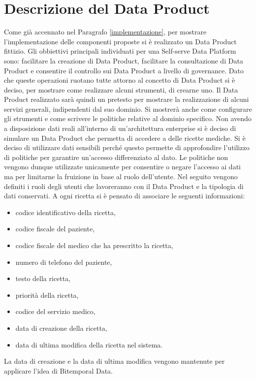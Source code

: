 \documentclass[a4paper,12pt]{report}
\begin{document}
\section{Descrizione del Data Product}\label{caratteristicheDP}
Come già accennato nel Paragrafo \ref{implementazione}, per mostrare l'implementazione delle componenti proposte si è realizzato un Data Product fittizio.
Gli obbiettivi principali individuati per una Self-serve Data Platform sono: facilitare la creazione di Data Product, facilitare la consultazione di Data Product e consentire il controllo sui Data Product a livello di governance. 
Dato che queste operazioni ruotano tutte attorno al concetto di Data Product si è deciso, per mostrare come realizzare alcuni strumenti, di crearne uno.
Il Data Product realizzato sarà quindi un pretesto per mostrare la realizzazione di alcuni servizi generali, indipendenti dal suo dominio.
Si mostrerà anche come configurare gli strumenti e come scrivere le politiche relative al dominio specifico. 
Non avendo a disposizione dati reali all'interno di un'architettura enterprise si è deciso di simulare un Data Product che permetta di accedere a delle ricette mediche. 
Si è deciso di utilizzare dati sensibili perché questo permette di approfondire l'utilizzo di politiche per garantire un'accesso differenziato al dato.
Le politiche non vengono dunque utilizzate unicamente per consentire o negare l'accesso ai dati ma per limitarne la fruizione in base al ruolo dell'utente. 
Nel seguito vengono definiti i ruoli degli utenti che lavoreranno con il Data Product e la tipologia di dati conservati.  
A ogni ricetta si è pensato di associare le seguenti informazioni:\begin{itemize}
    \item codice identificativo della ricetta,
    \item codice fiscale del paziente,
    \item codice fiscale del medico che ha prescritto la ricetta,
    \item numero di telefono del paziente,
    \item testo della ricetta,
    \item priorità della ricetta,
    \item codice del servizio medico,
    \item data di creazione della ricetta,
    \item data di ultima modifica della ricetta nel sistema. 
\end{itemize}
La data di creazione e la data di ultima modifica vengono mantenute per applicare l'idea di Bitemporal Data.
\end{document}
